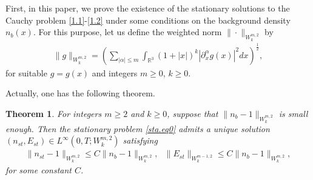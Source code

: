\documentclass[11pt]{amsart}
\newtheorem{theorem}{Theorem}[section]
\numberwithin{equation}{section}
\begin{document}
 First, in this paper, we prove the existence of the stationary
 solutions to the Cauchy problem \eqref{1.1}-\eqref{1.2} under
 some conditions on the background density $n_{b}(x)$. For this
 purpose, let us define the weighted norm
 $\|\cdot\|_{W_{k}^{m,2}}$ by
\begin{eqnarray}\label{def.norm}
\|g\|_{W_{k}^{m,2}}=\left(\sum_{|\alpha|\leq
m}\int_{\mathbb{R}^{3}}(1+|x|)^{k}|\partial^{\alpha}_{x}g(x)|^2dx\right)^{\frac{1}{2}},
\end{eqnarray}
for suitable $g=g(x)$ and integers $m\geq0$, $k\geq0$.

Actually, one has the following theorem.
\begin{theorem}\label{sta.existence}
For integers $m\geq 2$ and $k\geq 0$, suppose that
$\|n_{b}-1\|_{W_{k}^{m,2}}$ is small enough. Then the stationary
problem \eqref{sta.eq0} admits a unique solution $(n_{st},E_{st})\in
L^\infty(0, T; W_{k}^{m,2})$ satisfying
\begin{eqnarray}\label{sta.pro}
\|n_{st}-1\|_{{W_{k}^{m,2}}}\leq C \|n_{b}-1\|_{W_{k}^{m,2}},\ \ \
\|E_{st}\|_{{W_{k}^{m-1,2}}}\leq C \|n_{b}-1\|_{W_{k}^{m,2}},
\end{eqnarray}
for some constant $C$.
\end{theorem}
\end{document}
